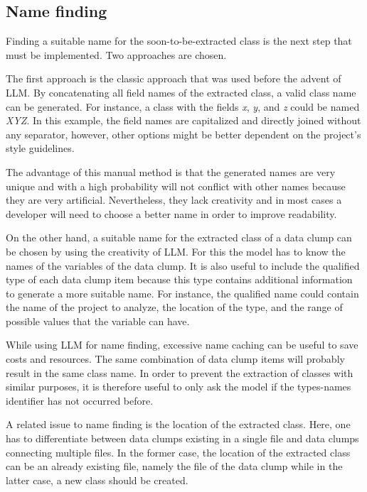 \subsection{Name finding}
Finding a suitable name for the soon-to-be-extracted class is the next step  that must be implemented. Two approaches are chosen.

The first approach is the classic approach that was used before the advent of \acs{LLM}. By concatenating all field names of the extracted class, a valid class name can be generated. For instance, a class with the fields \textit{x}, \textit{y}, and \textit{z} could be named \textit{XYZ}. In this example, the field names are capitalized and directly joined without any separator, however, other options might be better dependent on the project's style guidelines. 

The advantage of this manual method is that the generated names are very unique and with a high probability will not conflict with other names because they are very artificial. Nevertheless, they lack creativity and in most cases a developer will need to choose a better name in order to improve readability. 


On the other hand, a suitable name for the extracted class of a data clump can be chosen by using the creativity of \acs{LLM}.  For this the model has to know the names of the variables of the data clump. It is also useful to include the qualified type of each data clump item because this type contains additional information to generate a more suitable name. For instance, the qualified name could contain the name of the project to analyze, the location of the type,     and the range of possible values that the variable can have.

While using \acs{LLM} for name finding, excessive name caching can be useful to save costs and resources. The same combination of data clump items will probably result in the same class name. In order to prevent the extraction of classes with similar purposes, it is therefore useful to only ask the model if the types-names identifier has not occurred before. 

A related issue to name finding is the location of the extracted class. Here, one has to differentiate  between data clumps existing in a single file and data clumps connecting multiple files. In the former case, the location of the extracted class can be an already existing file, namely the file of the data clump  while in the latter case, a new class should be created.

